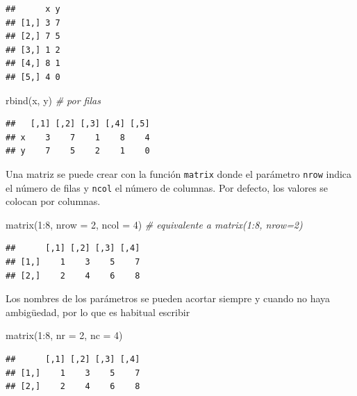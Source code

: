 \documentclass[
]{book}
\newenvironment{Shaded}{\begin{snugshade}}{\end{snugshade}}
\newcommand{\AttributeTok}[1]{\textcolor[rgb]{0.77,0.63,0.00}{#1}}
\newcommand{\CommentTok}[1]{\textcolor[rgb]{0.56,0.35,0.01}{\textit{#1}}}
\newcommand{\DecValTok}[1]{\textcolor[rgb]{0.00,0.00,0.81}{#1}}
\newcommand{\FunctionTok}[1]{\textcolor[rgb]{0.00,0.00,0.00}{#1}}
\newcommand{\NormalTok}[1]{#1}
\newcommand{\SpecialCharTok}[1]{\textcolor[rgb]{0.00,0.00,0.00}{#1}}
\theoremstyle{break}
\begin{document}
\begin{verbatim}
##      x y
## [1,] 3 7
## [2,] 7 5
## [3,] 1 2
## [4,] 8 1
## [5,] 4 0
\end{verbatim}

\begin{Shaded}
\begin{Highlighting}[]
\FunctionTok{rbind}\NormalTok{(x, y)  }\CommentTok{\# por filas}
\end{Highlighting}
\end{Shaded}

\begin{verbatim}
##   [,1] [,2] [,3] [,4] [,5]
## x    3    7    1    8    4
## y    7    5    2    1    0
\end{verbatim}

Una matriz se puede crear con la función \texttt{matrix} donde el parámetro
\texttt{nrow} indica el número de filas y \texttt{ncol} el número de columnas.
Por defecto, los valores se colocan por columnas.

\begin{Shaded}
\begin{Highlighting}[]
\FunctionTok{matrix}\NormalTok{(}\DecValTok{1}\SpecialCharTok{:}\DecValTok{8}\NormalTok{, }\AttributeTok{nrow =} \DecValTok{2}\NormalTok{, }\AttributeTok{ncol =} \DecValTok{4}\NormalTok{)  }\CommentTok{\# equivalente a matrix(1:8, nrow=2)}
\end{Highlighting}
\end{Shaded}

\begin{verbatim}
##      [,1] [,2] [,3] [,4]
## [1,]    1    3    5    7
## [2,]    2    4    6    8
\end{verbatim}

Los nombres de los parámetros se pueden acortar siempre y cuando no haya
ambigüedad, por lo que es habitual escribir

\begin{Shaded}
\begin{Highlighting}[]
\FunctionTok{matrix}\NormalTok{(}\DecValTok{1}\SpecialCharTok{:}\DecValTok{8}\NormalTok{, }\AttributeTok{nr =} \DecValTok{2}\NormalTok{, }\AttributeTok{nc =} \DecValTok{4}\NormalTok{)}
\end{Highlighting}
\end{Shaded}

\begin{verbatim}
##      [,1] [,2] [,3] [,4]
## [1,]    1    3    5    7
## [2,]    2    4    6    8
\end{verbatim}
\end{document}
